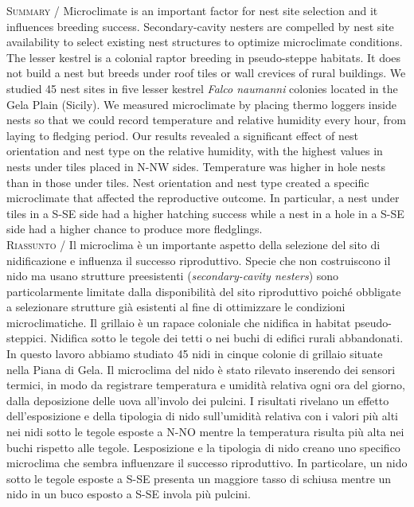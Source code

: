 {\small
\noindent \textsc{\color{MUSEBLUE} Summary} / Microclimate is an important factor for nest site selection and it
influences breeding success. Secondary-cavity nesters are compelled by
nest site availability to select existing nest structures to optimize
microclimate conditions. The lesser kestrel is a colonial raptor
breeding in pseudo-steppe habitats. It does not build a nest but breeds
under roof tiles or wall crevices of rural buildings. We studied 45
nest sites in five lesser kestrel \textit{Falco naumanni}\textbf{
}colonies located in the Gela Plain (Sicily). We measured microclimate
by placing thermo loggers inside nests so that we could record
temperature and relative humidity every hour, from laying to fledging
period. Our results revealed a significant effect of nest orientation
and nest type on the relative humidity, with the highest values in
nests under tiles placed in N-NW sides. Temperature was higher in hole
nests than in those under tiles. Nest orientation and nest type created
a specific microclimate that affected the reproductive outcome. In
particular, a nest under tiles in a S-SE side had a higher hatching
success while a nest in a hole in a S-SE side had a higher chance to
produce more fledglings.  \\
\noindent \textsc{\color{MUSEBLUE} Riassunto} / Il microclima \`e un importante aspetto della selezione del sito di
nidificazione e influenza il successo riproduttivo. Specie che non
costruiscono il nido ma usano strutture preesistenti
(\textit{secondary-cavity nesters}) sono particolarmente limitate dalla
disponibilit\`a del sito riproduttivo poich\'e obbligate a selezionare
strutture gi\`a esistenti al fine di ottimizzare le condizioni
microclimatiche. Il grillaio \`e un rapace coloniale che nidifica in
habitat pseudo-steppici. Nidifica sotto le tegole dei tetti o nei buchi
di edifici rurali abbandonati. In questo lavoro abbiamo studiato 45
nidi in cinque colonie di grillaio situate nella Piana di Gela. Il
microclima del nido \`e stato rilevato inserendo dei sensori termici,
in modo da registrare temperatura e umidit\`a relativa ogni ora del
giorno, dalla deposizione delle uova all{\textquoteright}involo dei
pulcini. I risultati rivelano un effetto
dell{\textquoteright}esposizione e della tipologia di nido
sull{\textquoteright}umidit\`a relativa con i valori pi\`u alti nei
nidi sotto le tegole esposte a N-NO mentre la temperatura risulta pi\`u
alta nei buchi rispetto alle tegole. L{\textquotesingle}esposizione e
la tipologia di nido creano uno specifico microclima che sembra
influenzare il successo riproduttivo. In particolare, un nido sotto le
tegole esposte a S-SE presenta un maggiore tasso di schiusa mentre un
nido in un buco esposto a S-SE invola pi\`u pulcini. \\
}


